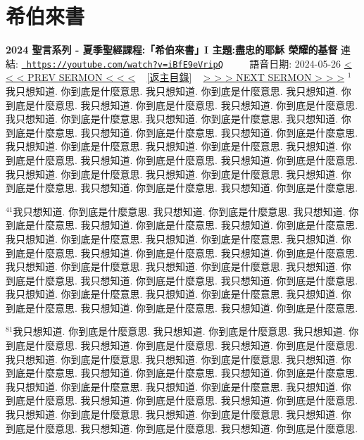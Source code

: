 \documentclass{book}
\begin{document}
\section{希伯來書}
\label{sec:iBfE9eVripQ}
\textbf{2024 聖言系列 - 夏季聖經課程:「希伯來書」I 主題:盡忠的耶穌 榮耀的基督}
\newline
\newline
連結: \href{https://youtube.com/watch?v=iBfE9eVripQ}{\texttt{ https://youtube.com/watch?v=iBfE9eVripQ}} ~~~~ 語音日期: 2024-05-26 
\newline
\newline
\hyperref[sec:code]{\small{< < < PREV SERMON < < <}}
~
\hyperref[sec:index]{\small{[返主目錄]}}
~
\hyperref[sec:BQvEiworls4]{\small{> > > NEXT SERMON > > >}}
\newline
\newline
$^{1}$我只想知道.
你到底是什麼意思.
我只想知道.
你到底是什麼意思.
我只想知道.
你到底是什麼意思.
我只想知道.
你到底是什麼意思.
我只想知道.
你到底是什麼意思.
我只想知道.
你到底是什麼意思.
我只想知道.
你到底是什麼意思.
我只想知道.
你到底是什麼意思.
我只想知道.
你到底是什麼意思.
我只想知道.
你到底是什麼意思.
我只想知道.
你到底是什麼意思.
我只想知道.
你到底是什麼意思.
我只想知道.
你到底是什麼意思.
我只想知道.
你到底是什麼意思.
我只想知道.
你到底是什麼意思.
我只想知道.
你到底是什麼意思.
我只想知道.
你到底是什麼意思.
我只想知道.
你到底是什麼意思.
我只想知道.
你到底是什麼意思.
我只想知道.
你到底是什麼意思.

$^{41}$我只想知道.
你到底是什麼意思.
我只想知道.
你到底是什麼意思.
我只想知道.
你到底是什麼意思.
我只想知道.
你到底是什麼意思.
我只想知道.
你到底是什麼意思.
我只想知道.
你到底是什麼意思.
我只想知道.
你到底是什麼意思.
我只想知道.
你到底是什麼意思.
我只想知道.
你到底是什麼意思.
我只想知道.
你到底是什麼意思.
我只想知道.
你到底是什麼意思.
我只想知道.
你到底是什麼意思.
我只想知道.
你到底是什麼意思.
我只想知道.
你到底是什麼意思.
我只想知道.
你到底是什麼意思.
我只想知道.
你到底是什麼意思.
我只想知道.
你到底是什麼意思.
我只想知道.
你到底是什麼意思.
我只想知道.
你到底是什麼意思.
我只想知道.
你到底是什麼意思.

$^{81}$我只想知道.
你到底是什麼意思.
我只想知道.
你到底是什麼意思.
我只想知道.
你到底是什麼意思.
我只想知道.
你到底是什麼意思.
我只想知道.
你到底是什麼意思.
我只想知道.
你到底是什麼意思.
我只想知道.
你到底是什麼意思.
我只想知道.
你到底是什麼意思.
我只想知道.
你到底是什麼意思.
我只想知道.
你到底是什麼意思.
我只想知道.
你到底是什麼意思.
我只想知道.
你到底是什麼意思.
我只想知道.
你到底是什麼意思.
我只想知道.
你到底是什麼意思.
我只想知道.
你到底是什麼意思.
我只想知道.
你到底是什麼意思.
我只想知道.
你到底是什麼意思.
我只想知道.
你到底是什麼意思.
我只想知道.
你到底是什麼意思.
我只想知道.
你到底是什麼意思.
\end{document}
